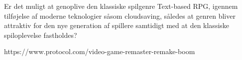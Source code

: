Er det muligt at genoplive den klassiske spilgenre Text-based RPG, igennem tilføjelse af moderne teknologier såsom cloudsaving, således at genren bliver attraktiv
for den nye generation af spillere samtidigt med at den klassiske spiloplevelse fastholdes?
\newpage


https://www.protocol.com/video-game-remaster-remake-boom
